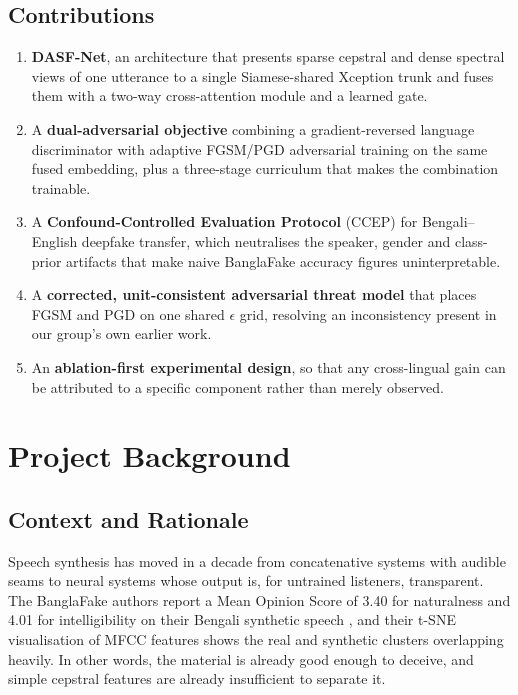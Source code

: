 \documentclass[conference]{IEEEtran}
\begin{document}
\subsection{Contributions}
\begin{enumerate}
\item \textbf{DASF-Net}, an architecture that presents sparse cepstral and
      dense spectral views of one utterance to a single Siamese-shared
      Xception trunk and fuses them with a two-way cross-attention module and
      a learned gate.
\item A \textbf{dual-adversarial objective} combining a gradient-reversed
      language discriminator with adaptive FGSM/PGD adversarial training on
      the same fused embedding, plus a three-stage curriculum that makes the
      combination trainable.
\item A \textbf{Confound-Controlled Evaluation Protocol} (CCEP) for
      Bengali--English deepfake transfer, which neutralises the speaker,
      gender and class-prior artifacts that make naive BanglaFake accuracy
      figures uninterpretable.
\item A \textbf{corrected, unit-consistent adversarial threat model} that
      places FGSM and PGD on one shared $\epsilon$ grid, resolving an
      inconsistency present in our group's own earlier work.
\item An \textbf{ablation-first experimental design}, so that any
      cross-lingual gain can be attributed to a specific component rather
      than merely observed.
\end{enumerate}

\section{Project Background}

\subsection{Context and Rationale}
Speech synthesis has moved in a decade from concatenative systems with audible
seams to neural systems whose output is, for untrained listeners, transparent.
The BanglaFake authors report a Mean Opinion Score of 3.40 for naturalness and
4.01 for intelligibility on their Bengali synthetic speech
\cite{fahad2025banglafake}, and their t-SNE visualisation of MFCC features
shows the real and synthetic clusters overlapping heavily. In other words, the
material is already good enough to deceive, and simple cepstral features are
already insufficient to separate it.
\end{document}
